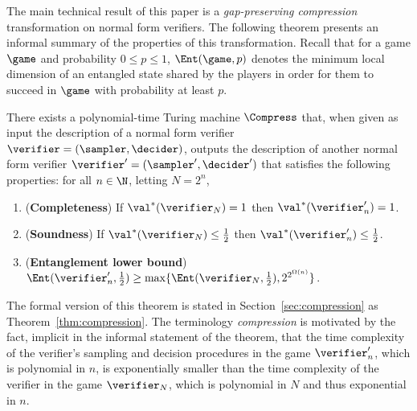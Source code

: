 The main technical result of this paper is a \emph{gap-preserving compression} transformation on normal form verifiers. The following theorem presents an informal summary of the properties of this transformation. Recall that for a  game $\game$ and probability $0\leq p \leq 1$, $\Ent(\game,p)$ denotes the minimum local dimension of an entangled state shared by the players in order for them to succeed in $\game$ with probability at least $p$.

\begin{theorem}
\label{thm:compression-informal}
There exists a polynomial-time Turing machine $\Compress$ that, when given as input the description of a normal form verifier $\verifier = (\sampler,\decider)$, outputs the description of another normal form verifier $\verifier' = (\sampler',\decider')$ that satisfies the following properties: for all $n \in \N$, letting $N = 2^n$,
\begin{enumerate}
\item (\textbf{Completeness}) If $\val^*(\verifier_N) = 1$ then $\val^*(\verifier'_n) = 1$.
\item (\textbf{Soundness}) If $\val^*(\verifier_N) \leq \frac{1}{2}$ then $\val^*(\verifier'_n) \leq \frac{1}{2}$.
\item (\textbf{Entanglement lower bound}) $\Ent(\verifier_n',\frac{1}{2}) \geq \max \{ \Ent(\verifier_N,\frac{1}{2}), 2^{2^{\Omega(n)}} \}$. 
\end{enumerate}
\end{theorem}
\noindent The formal version of this theorem is stated in Section~\ref{sec:compression} as Theorem~\ref{thm:compression}. The terminology \emph{compression} is motivated by the fact, implicit in the informal statement of the theorem, that the time complexity of the verifier's sampling and decision procedures in the game $\verifier_n'$, which is polynomial in $n$, is exponentially smaller than the time complexity of the verifier in the game $\verifier_N$, which is polynomial in $N$ and thus exponential in $n$. 

